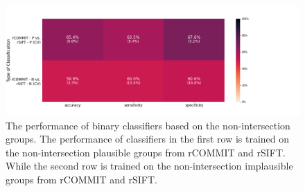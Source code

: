 \begin{figure}[ht]
    \centering
    \includegraphics[width= 12cm]{figures/inter_tf_classifiers.png}
    \caption{The performance of binary classifiers based on the non-intersection groups.
    The performance of classifiers in the first row is trained on the non-intersection plausible groups from rCOMMIT and rSIFT.
    While the second row is trained on the non-intersection implausible groups from rCOMMIT and rSIFT.}
\label{fig:inter_classifiers_tf}
\end{figure}
